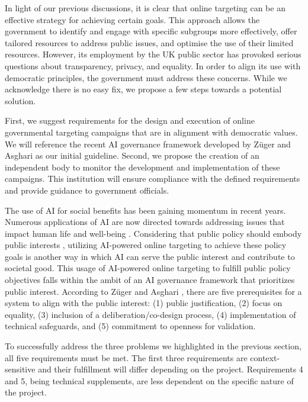 \documentclass[preprint]{acmart}
\begin{document}
In light of our previous discussions, it is clear that online targeting can be an effective strategy for achieving certain goals. This approach allows the government to identify and engage with specific subgroups more effectively, offer tailored resources to address public issues, and optimise the use of their limited resources. However, its employment by the UK public sector has provoked serious questions about transparency, privacy, and equality. In order to align its use with democratic principles, the government must address these concerns. While we acknowledge there is no easy fix, we propose a few steps towards a potential solution.


First, we suggest requirements for the design and execution of online governmental targeting campaigns that are in alignment with democratic values. We will reference the recent AI governance framework developed by Züger and Asghari \cite{zuger2022} as our initial guideline. Second, we propose the creation of an independent body to monitor the development and implementation of these campaigns. This institution will ensure compliance with the defined requirements and provide guidance to government officials.



The use of AI for social benefits has been gaining momentum in recent years. Numerous applications of AI are now directed towards addressing issues that impact human life and well-being \cite{tomavsev2020ai,cowls2021definition}. Considering that public policy should embody public interests \cite{dejersey2003}, utilizing AI-powered online targeting to achieve these policy goals is another way in which AI can serve the public interest and contribute to societal good. This usage of AI-powered online targeting to fulfill public policy objectives falls within the ambit of an AI governance framework that prioritizes public interest. According to Züger and Asghari \cite{zuger2022}, there are five prerequisites for a system to align with the public interest: (1) public justification, (2) focus on equality, (3) inclusion of a deliberation/co-design process, (4) implementation of technical safeguards, and (5) commitment to openness for validation.


To successfully address the three problems we highlighted in the previous section, all five requirements must be met. The first three requirements are context-sensitive and their fulfillment will differ depending on the project. Requirements 4 and 5, being technical supplements, are less dependent on the specific nature of the project. 
\end{document}
